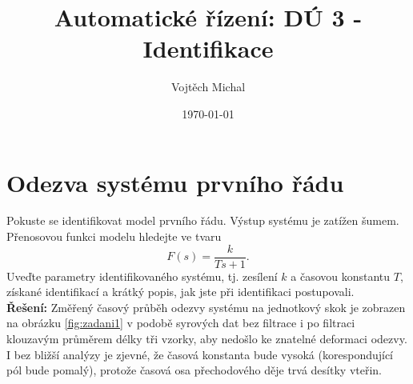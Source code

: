 \documentclass[twoside]{article}
\title{Automatické řízení: DÚ 3 - Identifikace}
\author{Vojtěch Michal}
\date{\today}
\begin{document}
\maketitle


\newcommand{\rad}{{rad}}
\renewcommand{\norm}{{norm}}
\renewcommand{\tan}{{tan}}

\section{Odezva systému prvního řádu}
Pokuste se identifikovat model prvního řádu. Výstup systému je zatížen šumem. Přenosovou funkci
modelu hledejte ve tvaru
\begin{equation}
	\label{eq:obecne1}
	F(s) = \frac{k}{Ts + 1}.
\end{equation}
Uveďte parametry identifikovaného systému, tj. zesílení $k$ a časovou konstantu $T$, získané identifikací a
krátký popis, jak jste při identifikaci postupovali. \\
\textbf{Řešení:} Změřený časový průběh odezvy systému na jednotkový skok je zobrazen na obrázku \ref{fig:zadani1}
v podobě syrových dat bez filtrace i po filtraci klouzavým průměrem délky tři vzorky, aby nedošlo ke znatelné deformaci odezvy.
I bez bližší analýzy je zjevné, že časová konstanta bude vysoká (korespondující pól bude pomalý), protože časová osa
přechodového děje trvá desítky vteřin. 
\end{document}
